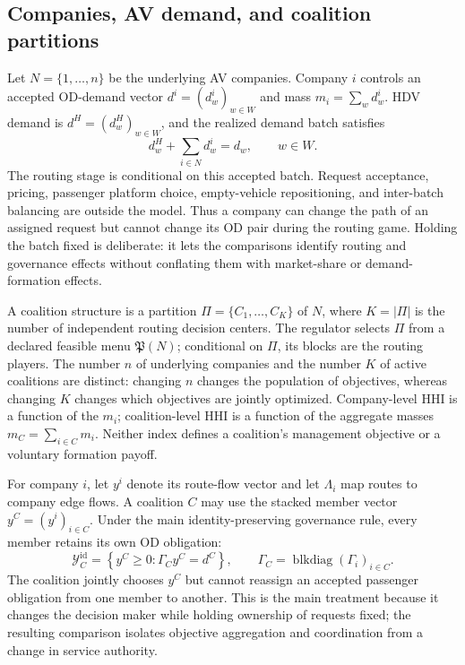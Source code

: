\subsection{Companies, AV demand, and coalition partitions}\label{sec:model_companies}

Let $N=\{1,\ldots,n\}$ be the underlying AV companies. Company $i$ controls an accepted OD-demand vector $d^i=(d_w^i)_{w\in W}$ and mass $m_i=\sum_wd_w^i$. HDV demand is $d^H=(d_w^H)_{w\in W}$, and the realized demand batch satisfies
\begin{equation}\label{eq:company-demand}
 d_w^H+\sum_{i\in N}d_w^i=d_w,\qquad w\in W.
\end{equation}
The routing stage is conditional on this accepted batch. Request acceptance, pricing, passenger platform choice, empty-vehicle repositioning, and inter-batch balancing are outside the model. Thus a company can change the path of an assigned request but cannot change its OD pair during the routing game. Holding the batch fixed is deliberate: it lets the comparisons identify routing and governance effects without conflating them with market-share or demand-formation effects.

A coalition structure is a partition $\Pi=\{C_1,\ldots,C_K\}$ of $N$, where $K=|\Pi|$ is the number of independent routing decision centers. The regulator selects $\Pi$ from a declared feasible menu $\mathfrak P(N)$; conditional on $\Pi$, its blocks are the routing players. The number $n$ of underlying companies and the number $K$ of active coalitions are distinct: changing $n$ changes the population of objectives, whereas changing $K$ changes which objectives are jointly optimized. Company-level HHI is a function of the $m_i$; coalition-level HHI is a function of the aggregate masses $m_C=\sum_{i\in C}m_i$. Neither index defines a coalition's management objective or a voluntary formation payoff.

For company $i$, let $y^i$ denote its route-flow vector and let $\Lambda_i$ map routes to company edge flows. A coalition $C$ may use the stacked member vector $y^C=(y^i)_{i\in C}$. Under the main identity-preserving governance rule, every member retains its own OD obligation:
\begin{equation}\label{eq:identity-feasible}
 \mathcal Y_C^{\mathrm{id}}=
 \left\{y^C\geq0:\Gamma_Cy^C=d^C\right\},
 \qquad
 \Gamma_C=\operatorname{blkdiag}(\Gamma_i)_{i\in C}.
\end{equation}
The coalition jointly chooses $y^C$ but cannot reassign an accepted passenger obligation from one member to another. This is the main treatment because it changes the decision maker while holding ownership of requests fixed; the resulting comparison isolates objective aggregation and coordination from a change in service authority.

